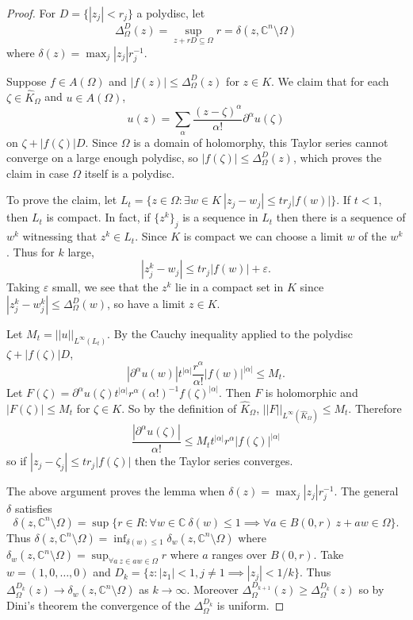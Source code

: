 \documentclass[12pt]{report}
\newcommand{\CC}{\mathbb{C}}
\theoremstyle{definition}
\begin{document}
\begin{proof}
    For $D = \{|z_j| < r_j\}$ a polydisc, let
    $$\Delta_\Omega^D(z) = \sup_{z + rD \subseteq \Omega} r = \delta(z, \CC^n \setminus \Omega)$$
    where $\delta(z) = \max_j |z_j|r_j^{-1}$.

    Suppose $f \in A(\Omega)$ and $|f(z)| \leq \Delta_\Omega^D(z)$ for $z \in K$. We claim that for each $\zeta \in \hat K_\Omega$ and $u \in A(\Omega)$,
    $$u(z) = \sum_\alpha \frac{(z - \zeta)^\alpha}{\alpha!} \partial^\alpha u(\zeta)$$
    on $\zeta + |f(\zeta)|D$. Since $\Omega$ is a domain of holomorphy, this Taylor series cannot converge on a large enough polydisc, so $|f(\zeta)| \leq \Delta_\Omega^D(z)$, which proves the claim in case $\Omega$ itself is a polydisc.

    To prove the claim, let $L_t = \{z \in \Omega: \exists w \in K~|z_j - w_j| \leq tr_j|f(w)|\}$. If $t < 1$, then $L_t$ is compact. In fact, if $\{z^k\}_j$ is a sequence in $L_t$ then there is a sequence of $w^k$ witnessing that $z^k \in L_t$. Since $K$ is compact we can choose a limit $w$ of the $w^k$. Thus for $k$ large,
    $$|z^k_j - w_j| \leq tr_j |f(w)| + \varepsilon.$$
    Taking $\varepsilon$ small, we see that the $z^k$ lie in a compact set in $K$ since $|z_j^k - w_j^k| \leq \Delta_\Omega^D(w)$, so have a limit $z \in K$.

    Let $M_t = ||u||_{L^\infty(L_t)}$. By the Cauchy inequality applied to the polydisc $\zeta + |f(\zeta)|D$,
    $$|\partial^\alpha u(w)| t^{|\alpha|} \frac{r^\alpha}{\alpha!} |f(w)|^{|\alpha|} \leq M_t.$$
    Let $F(\zeta) = \partial^\alpha u(\zeta) t^{|\alpha|} r^\alpha (\alpha!)^{-1} f(\zeta)^{|\alpha|}$. Then $F$ is holomorphic and $|F(\zeta)| \leq M_t$ for $\zeta \in K$. So by the definition of $\hat K_\Omega$, $||F||_{L^\infty(\hat K_\Omega)} \leq M_t$. Therefore
    $$\frac{|\partial^\alpha u(\zeta)|}{\alpha!} \leq M_t t^{|\alpha|} r^\alpha |f(\zeta)|^{|\alpha|}$$
    so if $|z_j - \zeta_j| \leq tr_j |f(\zeta)|$ then the Taylor series converges.

    The above argument proves the lemma when $\delta(z) = \max_j |z_j|r_j^{-1}$. The general $\delta$ satisfies
    $$\delta(z, \CC^n \setminus \Omega) = \sup \{r \in R: \forall w \in \CC ~\delta(w) \leq 1 \implies \forall a \in B(0, r) ~z + aw \in \Omega\}.$$
    Thus $\delta(z, \CC^n \setminus \Omega) = \inf_{\delta(w) \leq 1} \delta_w(z, \CC^n \setminus \Omega)$ where $\delta_w(z, \CC^n \setminus \Omega) = \sup_{\forall a ~z \in aw \in \Omega} r$ where $a$ ranges over $B(0, r)$. Take $w = (1, 0, \dots, 0)$ and $D_k = \{z: |z_1| < 1, j \neq 1 \implies |z_j| < 1/k\}$. Thus $\Delta^{D_k}_\Omega(z) \to \delta_w(z, \CC^n \setminus \Omega)$ as $k \to \infty$. Moreover $\Delta^{D_{k+1}}_\Omega(z) \geq \Delta^{D_k}_\Omega(z)$ so by Dini's theorem the convergence of the $\Delta^{D_k}_\Omega$ is uniform. 


\end{proof}
\end{document}
